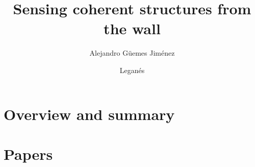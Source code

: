 \documentclass[thesissizeG5]{MechThesis}
\title[Sensing coherent structures from the wall]%
{%
	Sensing coherent structures from the wall
}%
\author{Alejandro G\"uemes Jim\'enez}%
\affiliation
{%
	Bioengineering and Aerospace Engineering Department, Universidad Carlos III de Madrid\\
	Avenida de la Universidad, 30, Legan\'es, Spain%
}%
\date{Legan\'es}{July}{2021}%
\begin{document}
%
\frontmatter




%
\mainmatter

\part{Overview and summary}

%



%
\tocpagebreak


%
\part{Papers}

%
\makepapersummary
\cleardoublepage

%


%


%



\end{document}
